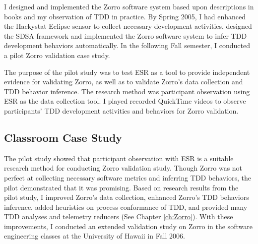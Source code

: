 I designed and implemented the Zorro software system based upon descriptions in books \cite{Beck:03,Astels:03,Newkirk:04,Link:03,Hunt:03} and my observation of TDD in practice. By Spring 2005, I had enhanced the Hackystat Eclipse sensor to collect necessary development activities, designed the SDSA  framework and implemented the Zorro software system to infer TDD development behaviors automatically. In the following Fall semester, I conducted a pilot Zorro validation case study.

The purpose of the pilot study was to test ESR as a tool to provide independent evidence for validating Zorro, as well as to validate Zorro's data collection and TDD behavior inference. The research method was participant observation using ESR as the data collection tool. I played recorded QuickTime videos to observe participants' TDD development activities and behaviors for Zorro validation. 

\begin{comment}
The specific research questions for the pilot study were:
\begin{itemize}
 \item Q1a: Does Zorro collect enough low-level development 
 activities to infer TDD behaviors?
 \item Q1b: Does Zorro's inference of TDD agree with analyses 
 based upon participant observation?
 \item Q1c: Is ESR a suitable tool for Zorro validation study?
\end{itemize}
\end{comment}


\subsection{Classroom Case Study}
The pilot study showed that participant observation with ESR is a suitable research method for conducting Zorro validation study. Though Zorro was not perfect at collecting necessary software metrics and inferring TDD behaviors, the pilot demonstrated that it was promising. Based on research results from the pilot study, I improved Zorro's data collection, enhanced Zorro's TDD behaviors inference, added heuristics on process conformance of TDD, and provided many TDD analyses and telemetry reducers (See Chapter \ref{ch:Zorro}). With these improvements, I conducted an extended validation study on Zorro in the software engineering classes at the University of Hawaii in Fall 2006. 

